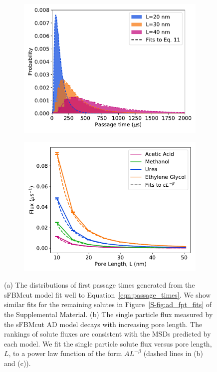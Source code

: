 \documentclass[aps,pre,preprint,groupedaddress,longbibliography]{revtex4-2}
\begin{document}
  \begin{figure}
  \centering
  \begin{subfigure}{0.485\textwidth}
  \includegraphics[width=\textwidth]{fpt_distributions.pdf}
  \caption{}\label{fig:fpt_distributions}
  \end{subfigure}
  \begin{subfigure}{0.485\textwidth}
  \includegraphics[width=\textwidth]{flux_curves.pdf}
  \caption{}\label{fig:flux_curves_ad}
  \end{subfigure}
  \caption{(a) The distributions of first passage times generated from the sFBMcut model
  fit well to Equation~\ref{eqn:passage_times}. We show similar fits for the remaining
  solutes in Figure~\ref{S-fig:ad_fpt_fits} of the Supplemental Material. (b) The 
  single particle flux measured by the sFBMcut AD model decays with increasing pore 
  length. The rankings of solute fluxes are consistent with the MSDs predicted by each
  model. We fit the single particle solute flux versus pore length, $L$, to a power law
  function of the form $AL^{-\beta}$ (dashed lines in (b) and (c)). 
  }\label{fig:flux_curves}
  \end{figure}
\end{document}

